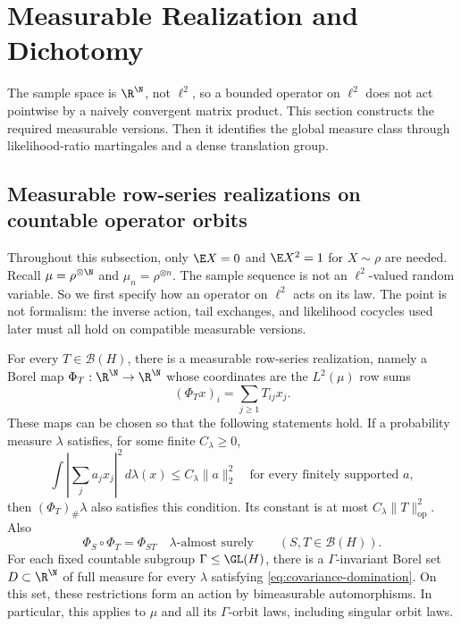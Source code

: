 \section{Measurable Realization and Dichotomy}
\label{sec:measurable-realization-and-dichotomy}

The sample space is \(\R^{\N}\), not \(\ell^2\), so a bounded operator on
\(\ell^2\) does not act pointwise by a naively convergent matrix product.
This section constructs the required measurable versions.
Then it identifies the global measure class through likelihood-ratio martingales
and a dense translation group.

\subsection{Measurable row-series realizations on countable operator orbits}
\label{sec:measurable-realization}

Throughout this subsection, only \(\E X=0\) and \(\E X^2=1\) for \(X\sim\rho\) are needed.
Recall \(\mu=\rho^{\otimes\N}\) and \(\mu_n=\rho^{\otimes n}\).
The sample sequence is not an \(\ell^2\)-valued random variable.
So we first specify how an operator on \(\ell^2\) acts on its law.
The point is not formalism: the inverse action, tail exchanges, and
likelihood cocycles used later must all hold on compatible measurable
versions.

\begin{lemma}
\label{lem:measurable-row-series-realization}
For every \(T\in\mathcal B(H)\), there is a measurable row-series
realization, namely a Borel map
\(\Phi_T:\R^{\N}\to\R^{\N}\) whose coordinates are the \(L^2(\mu)\) row sums
\[
  (\Phi_Tx)_i=\sum_{j\geq1}T_{ij}x_j.
\]
These maps can be chosen so that the following statements hold.
If a probability measure \(\lambda\) satisfies, for some finite
\(C_\lambda\geq0\),
\begin{equation}
  \int\left|\sum_j a_jx_j\right|^2\,d\lambda(x)
  \leq C_\lambda\|a\|_2^2
  \quad\text{for every finitely supported }a,
  \label{eq:covariance-domination}
\end{equation}
then \((\Phi_T)_\#\lambda\) also satisfies this condition.
Its constant is at most \(C_\lambda\|T\|_{\mathrm{op}}^2\).  Also
\begin{equation}
  \Phi_S\circ\Phi_T=\Phi_{ST}
  \quad\lambda\text{-almost surely}
  \qquad(S,T\in\mathcal B(H)).
  \label{eq:measurable-composition}
\end{equation}
For each fixed countable subgroup \(\Gamma\leq\GL(H)\),
there is a \(\Gamma\)-invariant Borel set \(D\subset\R^{\N}\) of full
measure for every \(\lambda\) satisfying
\eqref{eq:covariance-domination}.
On this set, these restrictions form an action by bimeasurable
automorphisms.
In particular, this applies to \(\mu\) and all its \(\Gamma\)-orbit laws,
including singular orbit laws.
\end{lemma}

